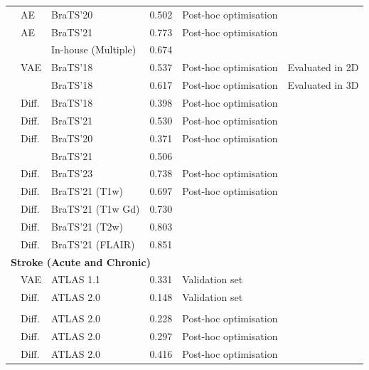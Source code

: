 \begin{longtable}{lp{1.2cm}lclp{5.5cm}}
\addlinespace
\citet{Ghorbel2023} & AE & BraTS'20 & 0.502 & Post-hoc optimisation & \\
\citet{Kascenas2023} & AE & BraTS'21 & 0.773 & Post-hoc optimisation & \\
 & & In-house (Multiple) & 0.674 & & \\
\citet{Pinaya2022-2} & VAE & BraTS'18 & 0.537 & Post-hoc optimisation & {Evaluated in 2D}\\
 & & BraTS'18 & 0.617 & Post-hoc optimisation & {Evaluated in 3D}\\
\citet{Pinaya2022-1} & Diff. & BraTS'18 & 0.398 & Post-hoc optimisation & \\
\citet{Iqbal2023} & Diff. & BraTS'21 & 0.530 & Post-hoc optimisation & \\
\citet{Kumar2024} & Diff. & BraTS'20 & 0.371 & Post-hoc optimisation & \\
 & & BraTS'21 & 0.506 &  & \\
\citet{Bi2025} & Diff. & BraTS'23 & 0.738 & Post-hoc optimisation & \\
\citet{Beizaee2026} & Diff. & BraTS'21 (T1w) & 0.697 & Post-hoc optimisation & \\
\citet{Beizaee2026} & Diff. & BraTS'21 (T1w Gd)& 0.730 & &\\
\citet{Beizaee2026} & Diff. & BraTS'21 (T2w)& 0.803 & & \\
\citet{Beizaee2026} & Diff. & BraTS'21 (FLAIR)& 0.851 & & \\
\hline

\multicolumn{6}{l}{\textbf{Stroke (Acute and Chronic)}} \\
\midrule
\citet{Bengs2021} & VAE & ATLAS 1.1 & 0.331 & Validation set & \\
\citet{Behrendt2024} & Diff. & ATLAS 2.0 & 0.148 & Validation set & \\
\addlinespace
\multicolumn{6}{l}{\textit{\small --- Studies using Retrospectively Optimized (Oracle) Thresholds ---}} \\
\addlinespace
\citet{Bercea2023} & Diff. & ATLAS 2.0 & 0.228 & Post-hoc optimisation & \\
\citet{Bercea2024} & Diff. & ATLAS 2.0 & 0.297 & Post-hoc optimisation & \\
\citet{Beizaee2026} & Diff. & ATLAS 2.0 & 0.416 & Post-hoc optimisation & \\
\hline


\end{longtable}
